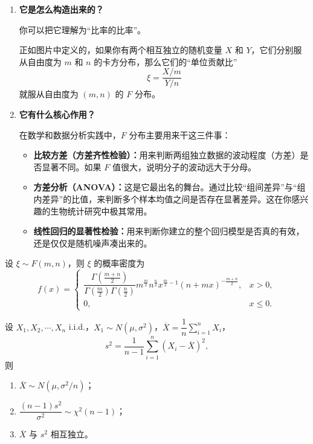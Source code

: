 \begin{note}
    \begin{enumerate}
    \item \textbf{它是怎么构造出来的？}

    你可以把它理解为“比率的比率”。

    正如图片中定义的，如果你有两个相互独立的随机变量 $X$ 和 $Y$，它们分别服从自由度为 $m$ 和 $n$ 的卡方分布，那么它们的“单位贡献比”
    \[
    \xi=\frac{X/m}{Y/n}
    \]
    就服从自由度为 $(m,n)$ 的 $F$ 分布。

    \item \textbf{它有什么核心作用？}

    在数学和数据分析实践中，$F$ 分布主要用来干这三件事：
    \begin{itemize}
        \item \textbf{比较方差（方差齐性检验）：}用来判断两组独立数据的波动程度（方差）是否显著不同。如果 $F$ 值很大，说明分子的波动远大于分母。
        \item \textbf{方差分析（ANOVA）：}这是它最出名的舞台。通过比较“组间差异”与“组内差异”的比值，来判断多个样本均值之间是否存在显著差异。这在你感兴趣的生物统计研究中极其常用。
        \item \textbf{线性回归的显著性检验：}用来判断你建立的整个回归模型是否真的有效，还是仅仅是随机噪声凑出来的。
    \end{itemize}
\end{enumerate}
\end{note}
\begin{theorem}[F的概率密度]
设 $\xi\sim F(m,n)$，则 $\xi$ 的概率密度为
\[
f(x)=
\begin{cases}
\dfrac{\Gamma\left(\frac{m+n}{2}\right)}{\Gamma\left(\frac{m}{2}\right)\Gamma\left(\frac{n}{2}\right)}
m^{\frac{m}{2}}n^{\frac{n}{2}}x^{\frac{m}{2}-1}(n+mx)^{-\frac{m+n}{2}},
& x>0,\\[1em]
0, & x\le 0.
\end{cases}
\]
\end{theorem}
\begin{theorem}[正态总体样本均值与样本方差的分布定理]
设 $X_1,X_2,\cdots,X_n$ i.i.d.，$X_1\sim N(\mu,\sigma^2)$，$\overline{X}=\dfrac{1}{n}\sum_{i=1}^n X_i$，
\[
s^2=\frac{1}{n-1}\sum_{i=1}^n (X_i-\overline{X})^2,
\]
则
\begin{enumerate}
    \item $\overline{X}\sim N(\mu,\sigma^2/n)$；
    \item $\dfrac{(n-1)s^2}{\sigma^2}\sim \chi^2(n-1)$；
    \item $\overline{X}$ 与 $s^2$ 相互独立。
\end{enumerate}
\end{theorem}
